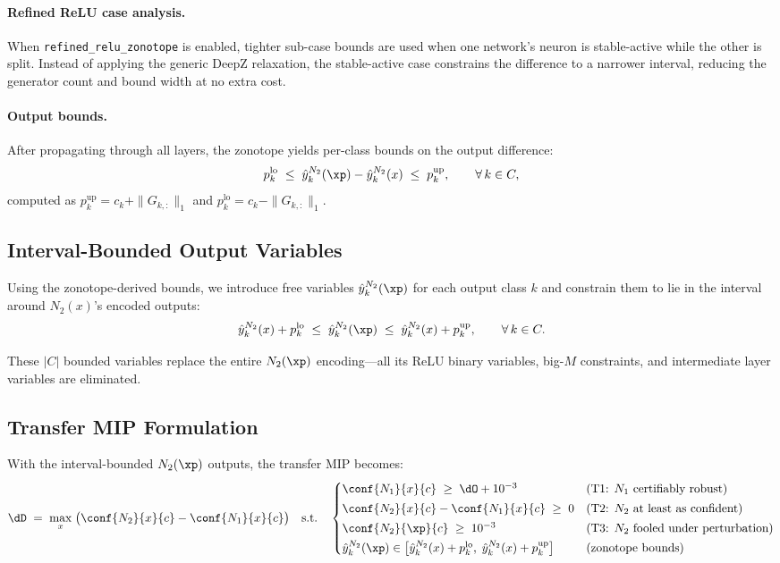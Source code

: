 \paragraph{Refined ReLU case analysis.}
When \texttt{refined\_relu\_zonotope} is enabled, tighter sub-case bounds are used when one network's neuron is stable-active while the other is split. Instead of applying the generic DeepZ relaxation, the stable-active case constrains the difference to a narrower interval, reducing the generator count and bound width at no extra cost.

\paragraph{Output bounds.}
After propagating through all layers, the zonotope yields per-class bounds on the output difference:
\[
  p^{\mathrm{lo}}_k \;\le\; \hat{y}^{N_2}_k(\xp) - \hat{y}^{N_2}_k(x) \;\le\; p^{\mathrm{up}}_k, \qquad \forall\, k \in C,
\]
computed as $p^{\mathrm{up}}_k = c_k + \|G_{k,:}\|_1$ and $p^{\mathrm{lo}}_k = c_k - \|G_{k,:}\|_1$.

\subsection{Interval-Bounded Output Variables}

Using the zonotope-derived bounds, we introduce free variables $\hat{y}^{N_2}_k(\xp)$ for each output class $k$ and constrain them to lie in the interval around $N_2(x)$'s encoded outputs:
\[
  \hat{y}^{N_2}_k(x) + p^{\mathrm{lo}}_k
  \;\le\;
  \hat{y}^{N_2}_k(\xp)
  \;\le\;
  \hat{y}^{N_2}_k(x) + p^{\mathrm{up}}_k,
  \qquad \forall\, k \in C.
\]

These $|C|$ bounded variables replace the entire $N_2(\xp)$ encoding---all its ReLU binary variables, big-$M$ constraints, and intermediate layer variables are eliminated.

\subsection{Transfer MIP Formulation}

With the interval-bounded $N_2(\xp)$ outputs, the transfer MIP becomes:
\begin{equation}
  \label{eq:transfer_no_n2xp}
  \dD \;=\; \max_{x}\; \bigl(\conf{N_2}{x}{c} - \conf{N_1}{x}{c}\bigr)
  \quad\text{s.t.}\quad
  \begin{cases}
    \conf{N_1}{x}{c} \;\ge\; \dO + 10^{-3} & \text{(T1: $N_1$ certifiably robust)} \\[2pt]
    \conf{N_2}{x}{c} - \conf{N_1}{x}{c} \;\ge\; 0 & \text{(T2: $N_2$ at least as confident)} \\[2pt]
    \conf{N_2}{\xp}{c} \;\ge\; 10^{-3} & \text{(T3: $N_2$ fooled under perturbation)} \\[2pt]
    \hat{y}^{N_2}_k(\xp) \in \bigl[\hat{y}^{N_2}_k(x) + p^{\mathrm{lo}}_k,\; \hat{y}^{N_2}_k(x) + p^{\mathrm{up}}_k\bigr] & \text{(zonotope bounds)}
  \end{cases}
\end{equation}

